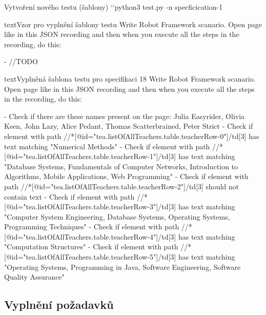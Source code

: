 \documentclass[czech, ma, kiv, he, iso690numb, pdf, viewonly]{fasthesis}
\begin{document}
            \begin{console}{Vytvoření nového testu (šablony) \label{con:new}}
`\uxprompt`python3 test.py -n specficication-1\end{console}

                \begin{code}{text}{Vzor pro vyplnění šablony testu \label{lst:template}}
Write Robot Framework scanario. Open page like in this JSON recording and then when you execute all the steps in the recording, do this:

- //TODO

{%

                \newpage

                \begin{code}{text}{Vyplněná šablona testu pro specifikaci 18 \label{lst:spec18}}
Write Robot Framework scanario. Open page like in this JSON recording and then when you execute all the steps in the recording, do this:

- Check if there are these names present on the page: Julia Easyrider, Olivia Keen, John Lazy, Alice Pedant, Thomas Scatterbrained, Peter Strict
- Check if element with path //*[@id="tea.listOfAllTeachers.table.teacherRow-0"]/td[3] has text matching "Numerical Methods"
- Check if element with path //*[@id="tea.listOfAllTeachers.table.teacherRow-1"]/td[3] has text matching "Database Systems, Fundamentals of Computer Networks, Introduction to Algorithms, Mobile Applications, Web Programming"
- Check if element with path //*[@id="tea.listOfAllTeachers.table.teacherRow-2"]/td[3] should not contain text
- Check if element with path //*[@id="tea.listOfAllTeachers.table.teacherRow-3"]/td[3] has text matching "Computer System Engineering, Database Systems, Operating Systems, Programming Techniques"
- Check if element with path //*[@id="tea.listOfAllTeachers.table.teacherRow-4"]/td[3] has text matching "Computation Structures"
- Check if element with path //*[@id="tea.listOfAllTeachers.table.teacherRow-5"]/td[3] has text matching "Operating Systems, Programming in Java, Software Engineering, Software Quality Assurance"

{%

                \subsection{Vyplnění požadavků}

}
\end{code}}
\end{code}
\end{document}
